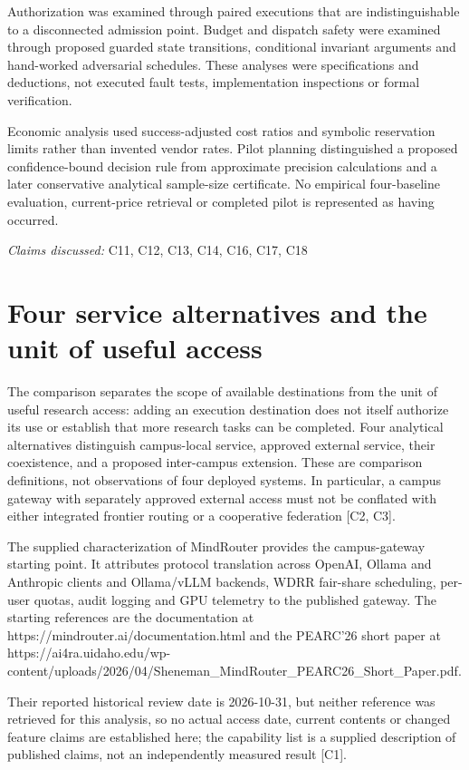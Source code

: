 \documentclass[11pt]{article}
\begin{document}
Authorization was examined through paired executions that are indistinguishable to a disconnected admission point. Budget and dispatch safety were examined through proposed guarded state transitions, conditional invariant arguments and hand-worked adversarial schedules. These analyses were specifications and deductions, not executed fault tests, implementation inspections or formal verification.

Economic analysis used success-adjusted cost ratios and symbolic reservation limits rather than invented vendor rates. Pilot planning distinguished a proposed confidence-bound decision rule from approximate precision calculations and a later conservative analytical sample-size certificate. No empirical four-baseline evaluation, current-price retrieval or completed pilot is represented as having occurred.

\textit{Claims discussed: }C11, C12, C13, C14, C16, C17, C18
\section{Four service alternatives and the unit of useful access}
The comparison separates the scope of available destinations from the unit of useful research access: adding an execution destination does not itself authorize its use or establish that more research tasks can be completed. Four analytical alternatives distinguish campus-local service, approved external service, their coexistence, and a proposed inter-campus extension. These are comparison definitions, not observations of four deployed systems. In particular, a campus gateway with separately approved external access must not be conflated with either integrated frontier routing or a cooperative federation [C2, C3].

The supplied characterization of MindRouter provides the campus-gateway starting point. It attributes protocol translation across OpenAI, Ollama and Anthropic clients and Ollama/vLLM backends, WDRR fair-share scheduling, per-user quotas, audit logging and GPU telemetry to the published gateway. The starting references are the documentation at https://mindrouter.ai/documentation.html and the PEARC\textquoteright{}26 short paper at https://ai4ra.uidaho.edu/wp-content/uploads/2026/04/Sheneman\_MindRouter\_PEARC26\_Short\_Paper.pdf.

Their reported historical review date is 2026-10-31, but neither reference was retrieved for this analysis, so no actual access date, current contents or changed feature claims are established here; the capability list is a supplied description of published claims, not an independently measured result [C1].
\end{document}
